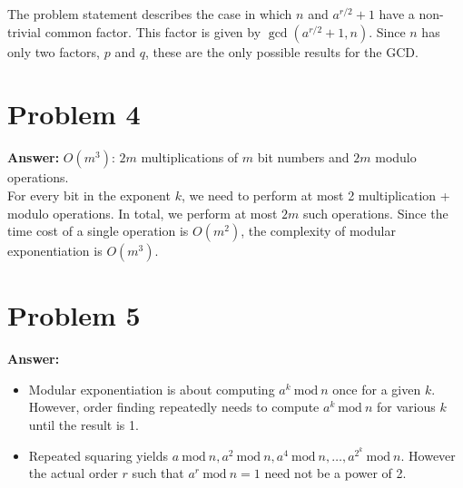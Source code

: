 \documentclass[11pt]{article}
\newcommand{\Mod}{\mathrm{mod}\:}
\begin{document}
The problem statement describes the case in which \(n\) and \(a^{r/2}+1\)
have a non-trivial common factor. This factor is given by \(\gcd(a^{r/2}+1,n)\).
Since \(n\) has only two factors, \(p\) and \(q\), these are the only
possible results for the GCD.
\section*{Problem 4}
\label{sec:orgb1ad0da}

\textbf{Answer:} \(O(m^3)\): \(2m\) multiplications of \(m\) bit numbers and
\(2m\) modulo operations.\\

For every bit in the exponent \(k\), we need to perform at most 2
multiplication + modulo operations. In total, we perform at most \(2m\) such
operations. Since the time cost of a single operation is \(O(m^2)\), the
complexity of modular exponentiation is \(O(m^3)\).
\section*{Problem 5}
\label{sec:org2f9fe44}

\textbf{Answer:}
\begin{itemize}
\item Modular exponentiation is about computing \(a^k\:\Mod n\) once for a given
\(k\). However, order finding repeatedly needs to compute \(a^k\:\Mod n\)
for various \(k\) until the result is 1.
\item Repeated squaring yields \(a\:\Mod n,a^2\:\Mod n,a^4\:\Mod n,\ldots ,a^{2^k}\:\Mod n\).
However the actual order \(r\) such that \(a^r\:\Mod n=1\) need not be a
power of 2.
\end{itemize}
\end{document}
